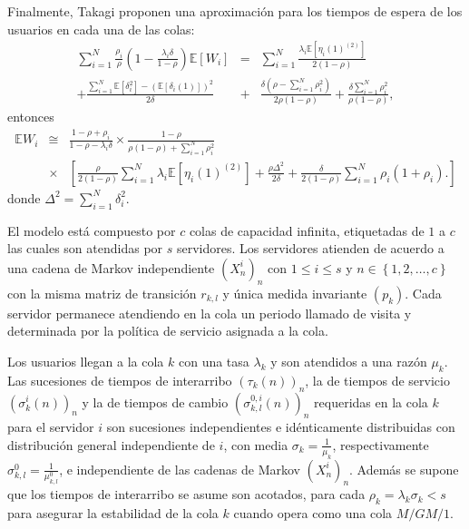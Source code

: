 \documentclass{article}
\newcommand{\esp}{\mathbb{E}}
\begin{document}
Finalmente, Takagi \cite{Takagi} proponen una aproximaci\'on para los tiempos de espera de los usuarios en cada una de las colas:
\begin{eqnarray*}
\sum_{i=1}^{N}\frac{\rho_{i}}{\rho}\left(1-\frac{\lambda_{i}\delta}{1-\rho}\right)\esp\left[W_{i}\right]&=&\sum_{i=1}^{N}\frac{\lambda_{i}\esp\left[\eta_{i}\left(1\right)^{(2)}\right]}{2\left(1-\rho\right)}\\
+\frac{\sum_{i=1}^{N}\esp\left[\delta_{i}^{2}\right]-\left(\esp\left[\delta_{i}\left(1\right)\right]\right)^{2}}{2\delta}&+&\frac{\delta\left(\rho-\sum_{i=1}^{N}\rho_{i}^{2}\right)}{2\rho\left(1-\rho\right)}+\frac{\delta\sum_{i=1}^{N}\rho_{i}^{2}}{\rho\left(1-\rho\right)},
\end{eqnarray*}
entonces
\begin{eqnarray*}\label{LPCPKL}
\esp
W_{i}&\cong&\frac{1-\rho+\rho_{i}}{1-\rho-\lambda_{i}\delta}\times\frac{1-\rho}{\rho\left(1-\rho\right)+\sum_{i=1}^{N}\rho_{i}^{2}}\\
&\times&\left[\frac{\rho}{2\left(1-\rho\right)}\sum_{i=1}^{N}\lambda_{i}\esp\left[\eta_{i}\left(1\right)^{(2)}\right]+\frac{\rho\Delta^{2}}{2\delta}+\frac{\delta}{2\left(1-\rho\right)}\sum_{i=1}^{N}\rho_{i}\left(1+\rho_{i}\right).\right]
\end{eqnarray*}
donde $\Delta^{2}=\sum_{i=1}^{N}\delta_{i}^{2}$. 

El modelo est\'a compuesto por $c$ colas de capacidad infinita, etiquetadas de $1$ a $c$ las cuales son atendidas por $s$
servidores. Los servidores atienden de acuerdo a una cadena de Markov independiente $\left(X^{i}_{n}\right)_{n}$ con $1\leq i\leq s$ y $n\in\left\{1,2,\ldots,c\right\}$ con la misma matriz de transici\'on $r_{k,l}$ y \'unica medida invariante $\left(p_{k}\right)$. Cada servidor permanece atendiendo en la cola un periodo llamado de visita y determinada por la pol\'itica de
servicio asignada a la cola.

Los usuarios llegan a la cola $k$ con una tasa $\lambda_{k}$ y son atendidos a una raz\'on $\mu_{k}$. Las sucesiones de tiempos de interarribo $\left(\tau_{k}\left(n\right)\right)_{n}$, la de
tiempos de servicio $\left(\sigma_{k}^{i}\left(n\right)\right)_{n}$ y la de tiempos de cambio $\left(\sigma_{k,l}^{0,i}\left(n\right)\right)_{n}$ requeridas en la cola $k$ para el servidor $i$ son sucesiones independientes e id\'enticamente distribuidas con distribuci\'on general independiente de $i$, con media $\sigma_{k}=\frac{1}{\mu_{k}}$, respectivamente $\sigma_{k,l}^{0}=\frac{1}{\mu_{k,l}^{0}}$, e independiente de las cadenas de Markov $\left(X^{i}_{n}\right)_{n}$. Adem\'as se supone que los tiempos de interarribo se asume son acotados, para cada $\rho_{k}=\lambda_{k}\sigma_{k}<s$ para asegurar la estabilidad de la cola $k$ cuando opera como una cola $M/GM/1$.
\end{document}
